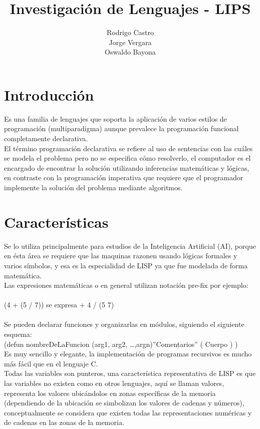 \documentclass[11pt]{article} %
\title{Investigación de Lenguajes - LIPS}
\author{Rodrigo Castro\\Jorge Vergara\\Oswaldo Bayona}
\begin{document}
\maketitle

\section{Introducción}

Es una familia de lenguajes que soporta la aplicación de varios estilos de programación 
(multiparadigma) aunque prevalece la programación funcional completamente declarativa.\\

El término programación declarativa se refiere al uso de sentencias con las cuáles se modela el
problema pero no se especifica cómo resolverlo,  el computador es el encargado de encontrar 
la solución utilizando inferencias matemáticas y lógicas, en contraste con la programación
imperativa que requiere que el programador implemente la  solución del problema mediante
algoritmos.\\

\section{Características}


Se lo utiliza principalmente para estudios de la Inteligencia Artificial (AI), porque en ésta área
se requiere que las maquinas razonen usando lógicas formales y varios símbolos, y esa es la especialidad de LISP
ya que fue modelada de forma matemática.\\


Las expresiones matemáticas o en general utilizan notación pre-fix por ejemplo:\\
\\ (4 + (5 / 7))  se expresa + 4 / (5  7)\\
\\ Se pueden declarar funciones y organizarlas en módulos, siguiendo el siguiente esquema:\\
	(defun nombreDeLaFuncion (arg1, arg2, …,argn)”Comentarios” (  Cuerpo ) )\\
	
Es muy sencillo y elegante, la implementación de programas recursivos es mucho más fácil que en el lenguaje C.\\

Todas las variables son punteros, una característica representativa de LISP es que las variables 
no existen como en otros lenguajes, aquí se llaman valores, representa los valores ubicándolos 
en zonas específicas de la memoria (dependiendo de la ubicación se simbolizan los valores
de cadenas y números), conceptualmente se considera que existen todas las representaciones
numéricas y de cadenas en las zonas de la memoria.\\
\end{document}

